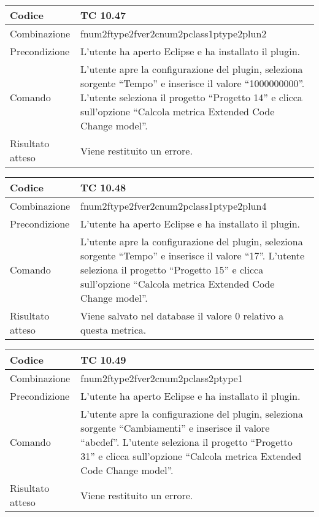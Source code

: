 \begin{table}[ht]
\begin{tabular}{|p{3cm}|p{9cm}|}
\hline
\cellcolor{lightgray}Codice				& TC 10.47								\\
\hline
\cellcolor{lightgray}Combinazione		& fnum2ftype2fver2cnum2pclass1ptype2plun2									\\
\hline
\cellcolor{lightgray}Precondizione		& L'utente ha aperto Eclipse e ha installato il plugin.		\\
\hline
\cellcolor{lightgray}Comando			& L'utente apre la configurazione del plugin, seleziona sorgente ``Tempo'' e inserisce il valore ``1000000000''. L'utente seleziona il progetto ``Progetto 14''  e clicca sull'opzione ``Calcola metrica Extended Code Change model''.	\\
\hline
\cellcolor{lightgray}Risultato atteso	& Viene restituito un errore.\\
\hline
\end{tabular}
\end{table}

\begin{table}[ht]
\begin{tabular}{|p{3cm}|p{9cm}|}
\hline
\cellcolor{lightgray}Codice				& TC 10.48								\\
\hline
\cellcolor{lightgray}Combinazione		& fnum2ftype2fver2cnum2pclass1ptype2plun4									\\
\hline
\cellcolor{lightgray}Precondizione		& L'utente ha aperto Eclipse e ha installato il plugin.		\\
\hline
\cellcolor{lightgray}Comando			& L'utente apre la configurazione del plugin, seleziona sorgente ``Tempo'' e inserisce il valore ``17''. L'utente seleziona il progetto ``Progetto 15''  e clicca sull'opzione ``Calcola metrica Extended Code Change model''.	\\
\hline
\cellcolor{lightgray}Risultato atteso	& Viene salvato nel database il valore 0 relativo a questa metrica.\\
\hline
\end{tabular}
\end{table}

\begin{table}[ht]
\begin{tabular}{|p{3cm}|p{9cm}|}
\hline
\cellcolor{lightgray}Codice				& TC 10.49								\\
\hline
\cellcolor{lightgray}Combinazione		& fnum2ftype2fver2cnum2pclass2ptype1									\\
\hline
\cellcolor{lightgray}Precondizione		& L'utente ha aperto Eclipse e ha installato il plugin.		\\
\hline
\cellcolor{lightgray}Comando			& L'utente apre la configurazione del plugin, seleziona sorgente ``Cambiamenti'' e inserisce il valore ``abcdef''. L'utente seleziona il progetto ``Progetto 31''  e clicca sull'opzione ``Calcola metrica Extended Code Change model''.	\\
\hline
\cellcolor{lightgray}Risultato atteso	& Viene restituito un errore.\\
\hline
\end{tabular}
\end{table}

